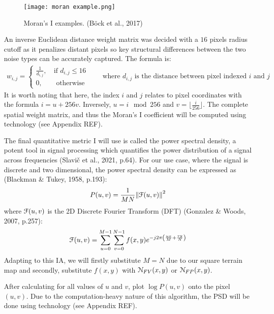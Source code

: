 \begin{figure}[H]
    \centering
    \texttt{[image: moran example.png]}
    \caption{Moran's I examples. (Böck et al., 2017)}
    \label{fig:moran_ex}
\end{figure}

An inverse Euclidean distance weight matrix was decided with a $16$ pixels radius cutoff as it penalizes distant pixels so key structural differences 
between the two noise types can be accurately captured. The formula is:
\begin{align*}
    w_{i,j}=
    \begin{cases}
        \frac{1}{d_{i,j}}, \quad\text{if } d_{i,j}\le16\\
        0, \qquad\text{otherwise}
    \end{cases}
    \qquad\text{where } d_{i,j} \text{ is the distance between pixel indexed } i \text{ and } j
\end{align*}
It is worth noting that here, the index $i$ and $j$ relates to pixel coordinates with the formula $i=u+256v$. Inversely, $u=i\mod 256$ and 
$v=\lfloor\frac{i}{256}\rfloor$. The complete spatial weight matrix, and thus the Moran's I coefficient will be computed using technology 
(see Appendix REF). 

The final quantitative metric I will use is called the power spectral density, a potent tool in signal processing which quantifies the power 
distribution of a signal across frequencies (Slavič et al., 2021, p.64). For our use case, where the signal is discrete and two dimensional, 
the power spectral density can be expressed as (Blackman \& Tukey, 1958, p.193):
\[P(u,v)=\frac{1}{MN}{\|\EuScript{F}(u,v)\|}^2\]
where $\EuScript{F}(u,v)$ is the 2D Discrete Fourier Transform (DFT) (Gonzalez \& Woods, 2007, p.257):
\[\EuScript{F}(u,v)=\sum_{u=0}^{M-1}\sum_{v=0}^{N-1}f(x,y)e^{-j2\pi\left(\frac{ux}{M}+\frac{vy}{N}\right)}\]
Adapting to this IA, we will firstly substitute $M=N$ due to our square terrain map and secondly, substitute $f(x,y)$ with $\EuScript{N}_{FV}(x,y)$
or $\EuScript{N}_{FP}(x,y)$.

After calculating for all values of $u$ and $v$, plot $\log P(u,v)$ onto the pixel $(u,v)$. Due to the computation-heavy nature of this algorithm, 
the PSD will be done using technology (see Appendix REF).
